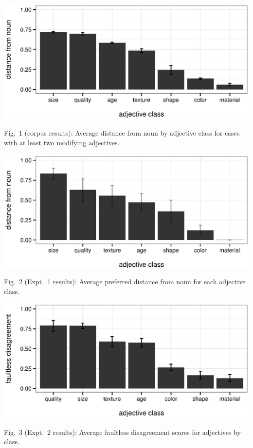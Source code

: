 \documentclass[12pt]{article}
\begin{document}
\noindent
\begin{minipage}[t]{.48\linewidth}
	\vspace{0pt}
	\begin{center}
		\includegraphics[width=\linewidth]{plots/corpus_distance_plot.eps}
	\end{center}
	\vspace{-15pt}
	Fig.~1 (corpus results): Average distance from noun by adjective class for cases with at least two modifying adjectives.
	\begin{center}
		\includegraphics[width=\linewidth]{plots/class_distance_by_adj.eps}
	\end{center}
	\vspace{-15pt}
	Fig.~2 (Expt.~1 results): Average preferred distance from noun for each adjective class.
	\begin{center}
		\includegraphics[width=\linewidth]{plots/faultless_class_plot.eps}
	\end{center}
	\vspace{-15pt}
	Fig.~3 (Expt.~2 results): Average faultless disagreement scores for adjectives by class.
\end{minipage} \hfill
\end{document}
